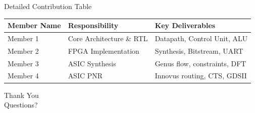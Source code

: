 \documentclass[10pt]{beamer}
\begin{document}
\begin{frame}{Detailed Contribution Table}
    \centering
    \footnotesize %
    \begin{tabular}{p{2.5cm} p{4cm} p{3.5cm}}
        \toprule
        \textbf{Member Name} & \textbf{Responsibility} & \textbf{Key Deliverables} \\
        \midrule
        Member 1 & Core Architecture \& RTL & Datapath, Control Unit, ALU \\
        \addlinespace
        Member 2 & FPGA Implementation & Synthesis, Bitstream, UART \\
        \addlinespace
        Member 3 & ASIC Synthesis & Genus flow, constraints, DFT \\
        \addlinespace
        Member 4 & ASIC PNR & Innovus routing, CTS, GDSII \\
        \bottomrule
    \end{tabular}
\end{frame}

\begin{frame}[standout]
    Thank You \\
    \vspace{1em}
    \normalsize Questions?
\end{frame}
\end{document}
